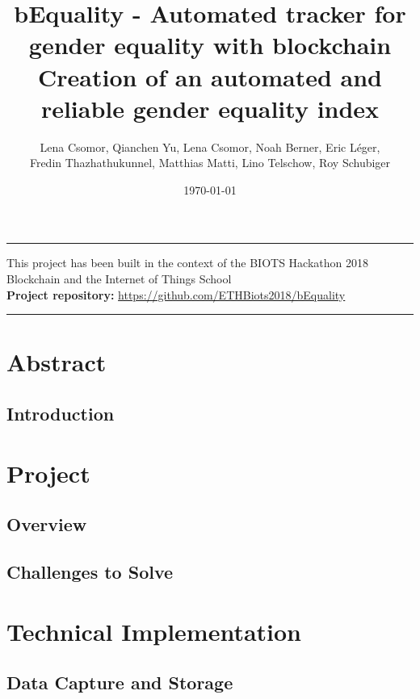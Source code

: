 \documentclass[portrait,a4paper]{article}
\title{bEquality - Automated tracker for gender equality with blockchain \\[-10pt] Creation of an automated and reliable gender equality index}
\author{Lena Csomor, Qianchen Yu, Lena Csomor, Noah Berner, Eric Léger,\\[-4pt] Fredin Thazhathukunnel, Matthias Matti, Lino Telschow, Roy Schubiger}
\date{\today}
\begin{document}
\maketitle

\vspace{1pt}
\hrule
\vspace{1pt}

\begin{center}
	This project has been built in the context of the BIOTS Hackathon 2018\\
	Blockchain and the Internet of Things School\\[8pt]
	\textbf{Project repository:} \url{https://github.com/ETHBiots2018/bEquality}
\end{center}

\vspace{1pt}
\hrule
\vspace{1pt}

\section*{Abstract}

	\clearpage
	
	\subsection*{Introduction}
		
	
\section{Project}
	
	\subsection{Overview}
		
	
	\subsection{Challenges to Solve}
		
			
\section{Technical Implementation}
	
	\subsection{Data Capture and Storage}
		
				
\end{document}
